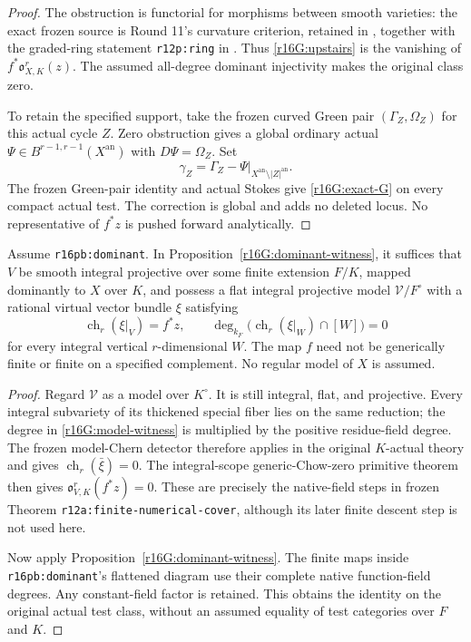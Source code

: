 \begin{proof}
The obstruction is functorial for morphisms between smooth
varieties: the exact frozen source is Round 11's curvature
criterion, retained in
, together
with the graded-ring statement \texttt{r12p:ring} in
.
Thus \eqref{r16G:upstairs} is the vanishing of
$f^*\mathfrak o_{X,K}^r(z)$.  The assumed all-degree dominant
injectivity makes the original class zero.

To retain the specified support, take the frozen curved
Green pair $(\Gamma_Z,\Omega_Z)$ for this actual cycle $Z$.
Zero obstruction gives a global ordinary actual
$\Psi\in B^{r-1,r-1}(X^{\mathrm{an}})$ with
$D\Psi=\Omega_Z$.  Set
\[
              \gamma_Z=\Gamma_Z-
                        \Psi|_{X^{\mathrm{an}}\setminus|Z|^{\mathrm{an}}}.
\]
The frozen Green-pair identity and actual Stokes give
\eqref{r16G:exact-G} on every compact actual test.
The correction is global and adds no deleted locus.
No representative of $f^*z$ is pushed forward analytically.
\end{proof}

\begin{corollary}
\label{r16G:numerical-witness}
Assume \texttt{r16pb:dominant}.  In
Proposition~\ref{r16G:dominant-witness}, it suffices that
$V$ be smooth integral projective over some finite extension
$F/K$, mapped dominantly to $X$ over $K$, and possess a
flat integral projective model $\mathcal V/F^\circ$ with
a rational virtual vector bundle $\xi$ satisfying
\[
 \operatorname{ch}_r(\xi|_V)=f^*z,\qquad
 \deg_{k_F}\bigl(\operatorname{ch}_r(\xi|_W)\cap[W]\bigr)=0
\tag{GC16.3}\label{r16G:model-witness}
\]
for every integral vertical $r$-dimensional $W$.
The map $f$ need not be generically finite or finite on a
specified complement.  No regular model of $X$ is assumed.
\end{corollary}

\begin{proof}
Regard $\mathcal V$ as a model over $K^\circ$.  It is still
integral, flat, and projective.  Every integral subvariety
of its thickened special fiber lies on the same reduction;
the degree in \eqref{r16G:model-witness} is multiplied by
the positive residue-field degree.  The frozen model-Chern
detector therefore applies in the original $K$-actual
theory and gives $\operatorname{ch}_r(\bar\xi)=0$.
The integral-scope generic-Chow-zero primitive theorem
then gives $\mathfrak o_{V,K}^r(f^*z)=0$.
These are precisely the native-field steps in frozen
Theorem \texttt{r12a:finite-numerical-cover}, although
its later finite descent step is not used here.

Now apply Proposition~\ref{r16G:dominant-witness}.
The finite maps inside \texttt{r16pb:dominant}'s flattened
diagram use their complete native function-field degrees.
Any constant-field factor is retained.  This obtains the
identity on the original actual test class, without an
assumed equality of test categories over $F$ and $K$.
\end{proof}

